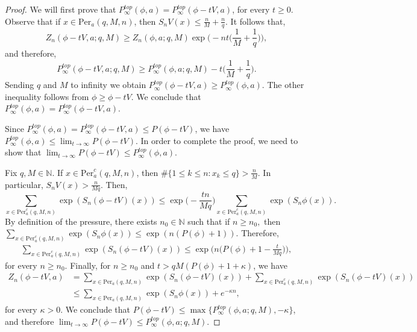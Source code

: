 \documentclass[10pt,a4paper]{amsart}
\def\N{{\mathbb N}}
\begin{document}
\begin{proof} We will first prove that $P^{top}_\infty(\phi,a)=P^{top}_\infty(\phi-tV,a)$, for every $t\ge 0$. Observe that if $x\in \text{Per}_a(q,M,n)$, then $S_nV(x)\le \frac{n}{M}+\frac{n}{q}$. It follows that,
$$Z_n(\phi-tV,a;q,M)\ge Z_n(\phi,a;q,M)\exp\bigg(-nt\bigg(\frac{1}{M}+\frac{1}{q}\bigg)\bigg),$$
and therefore,
$$P^{top}_\infty(\phi-tV,a;q,M)\ge P^{top}_\infty(\phi,a;q,M)-t\bigg(\frac{1}{M}+\frac{1}{q}\bigg).$$
Sending $q$ and $M$ to infinity we obtain $P^{top}_\infty(\phi-tV,a)\ge P^{top}_\infty(\phi,a)$. The other inequality follows from $\phi\ge \phi-tV$. We conclude that $P_\infty^{top}(\phi,a)=P_\infty^{top}(\phi-tV,a)$. 

Since $P^{top}_\infty(\phi,a)=P^{top}_\infty(\phi-tV,a)\le P(\phi-tV)$, we have $P^{top}_\infty(\phi,a)\le \lim_{t\to\infty}P(\phi-tV)$. In order to complete the proof, we need to show that  $\lim_{t\to\infty}P(\phi-tV)\le P^{top}_\infty(\phi,a)$. 

Fix $q,M\in\N$. If $x\in \text{Per}_a^c(q,M,n)$, then $\#\{1\le k\le n:x_k\le q\}> \frac{n}{M}$. In particular, $S_nV(x)> \frac{n}{Mq}.$ Then,
$$\sum_{x\in \text{Per}_a^c(q,M,n)}\exp(S_n(\phi-tV)(x))\le \exp\bigg(-\frac{tn}{Mq}\bigg)\sum_{x\in \text{Per}_a^c(q,M,n)}\exp(S_n\phi(x)).$$
By definition of the pressure, there exists $n_0\in\N$ such that if $n\ge n_0,$ then \\$\sum_{x\in \text{Per}_a^c(q,M,n)}\exp(S_n\phi(x))\le \exp(n(P(\phi)+1)).$ Therefore,
\begin{align*}\sum_{x\in \text{Per}_a^c(q,M,n)}\exp(S_n(\phi-tV)(x))\le \exp\bigg(n\bigg(P(\phi)+1-\frac{t}{Mq}\bigg)\bigg),\end{align*}
for every $n\ge n_0$. Finally, for $n\ge n_0$ and $t>qM(P(\phi)+1+\kappa)$, we have
\begin{align*} Z_n(\phi-tV,a)&=\sum_{x\in \text{Per}_a(q,M,n)}\exp(S_n(\phi-tV)(x))+\sum_{x\in \text{Per}_a^c(q,M,n)}\exp(S_n(\phi-tV)(x))\\
&\le \sum_{x\in \text{Per}_a(q,M,n)}\exp(S_n\phi(x))+e^{-\kappa n},
 \end{align*}
for every $\kappa>0$. We conclude that $P(\phi-tV)\le \max\{P^{top}_\infty(\phi,a;q,M),-\kappa\}$, and therefore  $\lim_{t\to\infty}P(\phi-tV)\le P^{top}_\infty(\phi,a;q,M)$. 
\end{proof}
\end{document}
